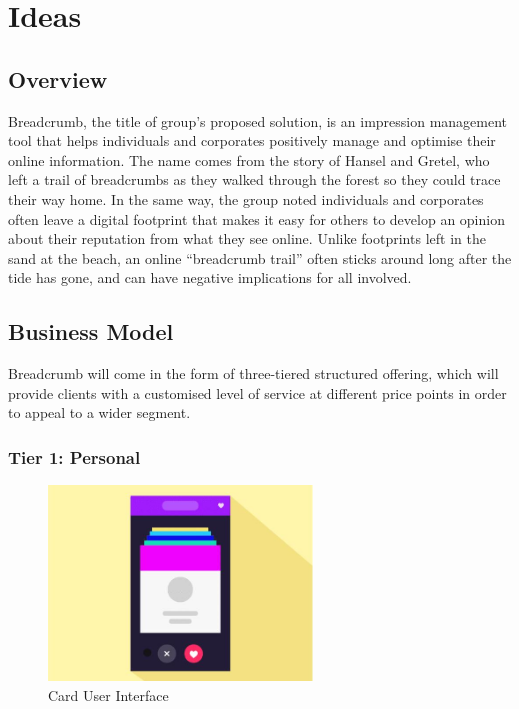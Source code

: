 \section{Ideas}

\subsection{Overview}

Breadcrumb, the title of group's proposed solution, is an impression management tool that helps individuals and corporates positively manage and optimise their online information. The name comes from the story of Hansel and Gretel, who left a trail of breadcrumbs as they walked through the forest so they could trace their way home. In the same way, the group noted individuals and corporates often leave a digital footprint that makes it easy for others to develop an opinion about their reputation from what they see online. Unlike footprints left in the sand at the beach, an online ``breadcrumb trail'' often sticks around long after the tide has gone, and can have negative implications for all involved.

\subsection{Business Model}

Breadcrumb will come in the form of three-tiered structured offering, which will provide clients with a customised level of service at different price points in order to appeal to a wider segment.

\subsubsection{Tier 1: Personal}

\begin{figure}
  \centering
  \begin{minipage}{7cm}
    \centering
    \includegraphics[width=7cm]{inc/flip_ui.jpg}
    \caption{Card User Interface}
    \label{fig:flipUI}
  \end{minipage}
\end{figure}

